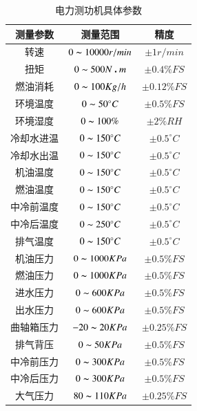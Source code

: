 \begin{table}[H]
	\centering
	\caption{电力测功机具体参数}
	\label{tab:dlcgjjtcs}
	\begin{tabular}{ccc}
	\hline
	测量参数 & 测量范围 & 精度\\\hline
	转速 & $0\thicksim10000r/min$ &$\pm 1 r/min$ \\
	扭矩 & $0\thicksim500N\centerdot m$ &$\pm 0.4 \%FS$ \\
	燃油消耗 &$0\thicksim100Kg/h$ & $\pm 0.12\% FS$ \\
	环境温度 &$0\thicksim50^{\circ}C$ & $\pm 0.5\% FS$ \\
	环境湿度 &$0\thicksim100\%$ & $\pm 2\% RH$ \\
	冷却水进温 &$0\thicksim150^{\circ}C$ & $\pm 0.5^{\circ}C$ \\
	冷却水出温 &$0\thicksim150^{\circ}C$ & $\pm 0.5^{\circ}C$ \\
	机油温度 &$0\thicksim150^{\circ}C$ & $\pm 0.5^{\circ}C$ \\
	燃油温度 &$0\thicksim150^{\circ}C$ & $\pm 0.5^{\circ}C$ \\
	中冷前温度 &$0\thicksim150^{\circ}C$ & $\pm 0.5^{\circ}C$ \\
	中冷后温度 &$0\thicksim250^{\circ}C$ & $\pm 0.5^{\circ}C$ \\
	排气温度 &$0\thicksim150^{\circ}C$ & $\pm 0.5^{\circ}C$ \\
	机油压力 &$0\thicksim1000KPa$ & $\pm 0.5\%FS$ \\
	燃油压力 &$0\thicksim1000KPa$ & $\pm 0.5\%FS$ \\
	进水压力 &$0\thicksim600KPa$ & $\pm 0.5\%FS$ \\
	出水压力 &$0\thicksim600KPa$ & $\pm 0.5\%FS$ \\
	曲轴箱压力 &$-20\thicksim20KPa$ & $\pm 0.25\%FS$ \\
	排气背压 &$0\thicksim50KPa$ & $\pm 0.5\%FS$ \\
	中冷前压力 &$0\thicksim300KPa$ & $\pm 0.5\%FS$ \\
	中冷后压力 &$0\thicksim300KPa$ & $\pm 0.5\%FS$ \\
	大气压力 &$80\thicksim110KPa$ & $\pm 0.25\%FS$ \\\hline
	\end{tabular}
\end{table}
